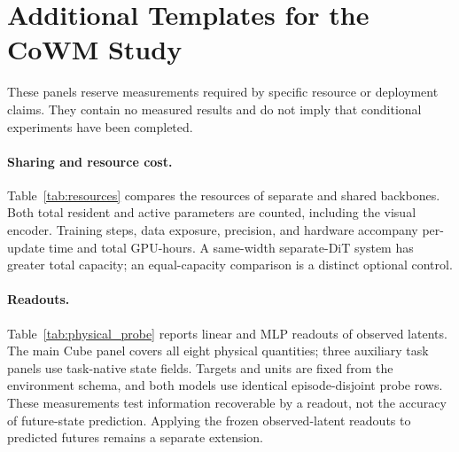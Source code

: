 \section{Additional Templates for the CoWM Study}
\label{app:budget_extensions}
These panels reserve measurements required by specific resource or deployment claims. They contain no measured results and do not imply that conditional experiments have been completed.

\paragraph{Sharing and resource cost.}
Table~\ref{tab:resources} compares the resources of separate and shared backbones. Both total resident and active parameters are counted, including the visual encoder. Training steps, data exposure, precision, and hardware accompany per-update time and total GPU-hours. A same-width separate-DiT system has greater total capacity; an equal-capacity comparison is a distinct optional control.
\begin{table}[t]
\centering\scriptsize
\resizebox{\textwidth}{!}{}
\caption{Resource measurements for completed sharing contrasts. Decision latency uses matched $N/S/K$ and the same hardware. Sharing weights alone does not remove the separate A/B computations.}
\label{tab:resources}
\end{table}

\paragraph{Readouts.}
Table~\ref{tab:physical_probe} reports linear and MLP readouts of observed latents. The main Cube panel covers all eight physical quantities; three auxiliary task panels use task-native state fields. Targets and units are fixed from the environment schema, and both models use identical episode-disjoint probe rows. These measurements test information recoverable by a readout, not the accuracy of future-state prediction. Applying the frozen observed-latent readouts to predicted futures remains a separate extension.
\begin{table}[t]
\centering\small
\resizebox{\textwidth}{!}{}
\caption{Observed-latent physical readouts. Entries report standardized-coordinate MSE and coordinate-mean Pearson $r$; MLP values are mean $\pm$ sample standard deviation over three readout seeds, while Linear is deterministic. Overall is an equal-weight mean over attributes. Cube is the main panel; TwoRoom, Push-T, and Reacher are auxiliary. Probe test episodes are disjoint from readout training and validation; this does not assert that the pretrained world models never saw those episodes.}
\label{tab:physical_probe}
\end{table}

